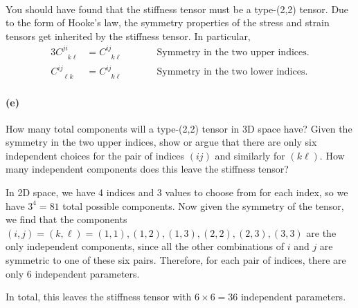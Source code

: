 \documentclass{article}
\begin{document}
\phline
\paragraph{}
You should have found that the stiffness tensor must be a type-(2,2) tensor.  Due to the form of Hooke's law, the symmetry properties of the stress and strain tensors get
inherited by the stiffness tensor.  In particular,
	\begin{alignat*}{3}
		C^{ji}_{\phantom{ij}k\ell} &= C^{ij}_{\phantom{ij}k\ell}		\qquad&&\mbox{Symmetry in the two upper indices.}\\
		C^{ij}_{\phantom{ij}\ell k} &= C^{ij}_{\phantom{ij}k\ell}		\qquad&&\mbox{Symmetry in the two lower indices.}
	\end{alignat*}

\paragraph{(e)}
How many total components will a type-(2,2) tensor in 3D space have?  Given the symmetry in the two upper indices, show or argue that there are only six independent choices 
for the pair of indices $(ij)$ and similarly for $(k\ell)$.  How many independent components does this leave the stiffness tensor?

\begin{solution}
	In 2D space, we have 4 indices and 3 values to choose from for each index, so we have $3^4 = 81$ total 
	possible components. Now given the symmetry of the tensor, we find that the components $(i, j) = (k, \ell) = (1, 1), 
	(1, 2), (1, 3), (2, 2), (2, 3), (3, 3)$ are the only independent components, since all the other combinations
	of $i$ and $j$ are symmetric to one of these six pairs. Therefore, for each pair of indices, there are 
	only 6 independent parameters.

	In total, this leaves the stiffness tensor with $6 \times 6 = 36$ independent parameters. 
\end{solution}

\phline
\end{document}

